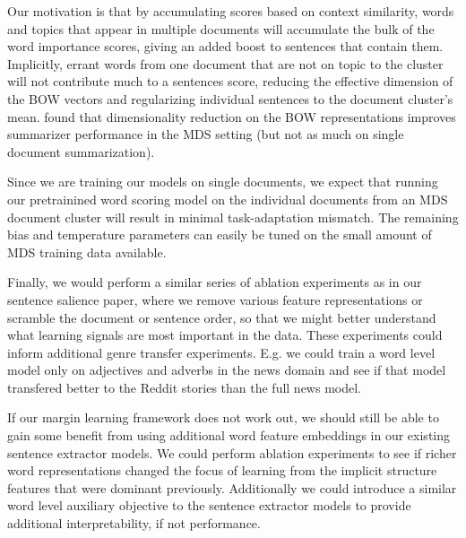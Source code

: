        Our motivation is that by accumulating scores based on context
        similarity, words and topics that appear in multiple documents 
        will accumulate the bulk of the word importance scores, giving 
        an added boost to sentences that contain them. Implicitly, errant
        words from one document that are not on topic to the cluster will
        not contribute much to a sentences score, reducing the 
        effective dimension of the BOW vectors and regularizing individual
        sentences to the document cluster's mean.
          \cite{conroy2013multilingual} 
        found
        that dimensionality reduction on the BOW representations improves
        summarizer performance in the MDS setting (but not as much on
 single document
        summarization). 


        
        Since we are training our models on single documents, we expect that
        running our pretrainined word scoring model on the individual 
        documents from an MDS document cluster will result in 
        minimal task-adaptation mismatch. The remaining bias and temperature
        parameters can easily be tuned on the small amount of MDS training 
        data available.



Finally, we would perform a similar series of ablation experiments as in
our sentence salience paper, where we 
remove various feature representations or scramble the document or sentence
order, so that we might better understand what learning signals are most 
important in the data. These experiments could inform additional genre 
transfer experiments. E.g. we could train a word level model only on 
adjectives and adverbs
in the news domain and see if that model transfered better to the Reddit
stories than the full news model.

If our margin learning framework does not work out, we should still be able to
gain some benefit from using additional word feature embeddings in our 
existing sentence extractor models. 
We could perform ablation experiments to see if richer word representations
changed the focus of learning from the implicit structure features that
were dominant previously. Additionally we could introduce a similar word
level auxiliary objective to the sentence extractor models to provide
additional interpretability, if not performance.






 
